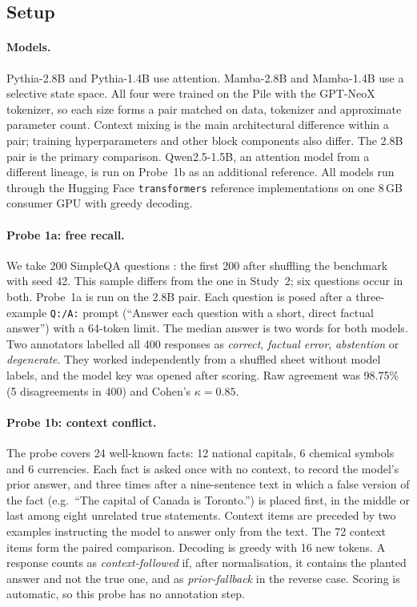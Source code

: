 \documentclass[10pt]{article}
\begin{document}
\subsection{Setup}

\paragraph{Models.} Pythia-2.8B and Pythia-1.4B \citep{biderman2023pythia} use attention. Mamba-2.8B and Mamba-1.4B \citep{gu2023mamba} use a selective state space. All four were trained on the Pile \citep{gao2020pile} with the GPT-NeoX tokenizer, so each size forms a pair matched on data, tokenizer and approximate parameter count. Context mixing is the main architectural difference within a pair; training hyperparameters and other block components also differ. The 2.8B pair is the primary comparison. Qwen2.5-1.5B, an attention model from a different lineage, is run on Probe~1b as an additional reference. All models run through the Hugging Face \texttt{transformers} reference implementations on one 8\,GB consumer GPU with greedy decoding.

\paragraph{Probe 1a: free recall.} We take 200 SimpleQA questions \citep{wei2024simpleqa}: the first 200 after shuffling the benchmark with seed 42. This sample differs from the one in Study~2; six questions occur in both. Probe~1a is run on the 2.8B pair. Each question is posed after a three-example \texttt{Q:/A:} prompt (``Answer each question with a short, direct factual answer'') with a 64-token limit. The median answer is two words for both models. Two annotators labelled all 400 responses as \emph{correct}, \emph{factual error}, \emph{abstention} or \emph{degenerate}. They worked independently from a shuffled sheet without model labels, and the model key was opened after scoring. Raw agreement was 98.75\% (5 disagreements in 400) and Cohen's $\kappa=0.85$.

\paragraph{Probe 1b: context conflict.} The probe covers 24 well-known facts: 12 national capitals, 6 chemical symbols and 6 currencies. Each fact is asked once with no context, to record the model's prior answer, and three times after a nine-sentence text in which a false version of the fact (e.g.\ ``The capital of Canada is Toronto.'') is placed first, in the middle or last among eight unrelated true statements. Context items are preceded by two examples instructing the model to answer only from the text. The 72 context items form the paired comparison. Decoding is greedy with 16 new tokens. A response counts as \emph{context-followed} if, after normalisation, it contains the planted answer and not the true one, and as \emph{prior-fallback} in the reverse case. Scoring is automatic, so this probe has no annotation step.
\end{document}
